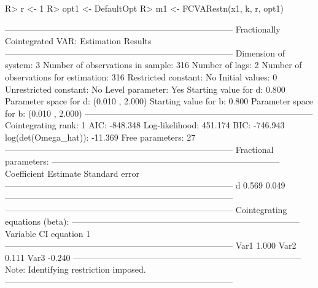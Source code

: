\documentclass[article]{jss}
\begin{document}
\begin{CodeChunk} 
\begin{CodeInput}
R> r <- 1
R> opt1 <- DefaultOpt
R> m1 <- FCVARestn(x1, k, r, opt1)
\end{CodeInput}
\begin{CodeOutput}
--------------------------------------------------------------------------------
                      Fractionally Cointegrated VAR: Estimation Results                              
--------------------------------------------------------------------------------
Dimension of system:       3      Number of observations in sample:          316 
Number of lags:            2      Number of observations for estimation:     316 
Restricted constant:      No      Initial values:                              0
Unrestricted constant:    No      Level parameter:                           Yes
Starting value for d:    0.800    Parameter space for d: (0.010 , 2.000) 
Starting value for b:    0.800    Parameter space for b: (0.010 , 2.000) 
--------------------------------------------------------------------------------
Cointegrating rank:            1  AIC:              -848.348 
Log-likelihood:          451.174  BIC:              -746.943 
log(det(Omega_hat)):     -11.369  Free parameters:        27 
--------------------------------------------------------------------------------
    Fractional parameters:                                                                             
--------------------------------------------------------------------------------
    Coefficient               Estimate                Standard error 
--------------------------------------------------------------------------------
         d                       0.569                      0.049                
--------------------------------------------------------------------------------
--------------------------------------------------------------------------------
    Cointegrating equations (beta):                                                                  
--------------------------------------------------------------------------------
      Variable        CI equation 1  
--------------------------------------------------------------------------------
        Var1              1.000     
        Var2              0.111     
        Var3             -0.240     
--------------------------------------------------------------------------------
Note: Identifying restriction imposed.                                                               
--------------------------------------------------------------------------------

\end{CodeOutput}
\end{CodeChunk}
\end{document}
